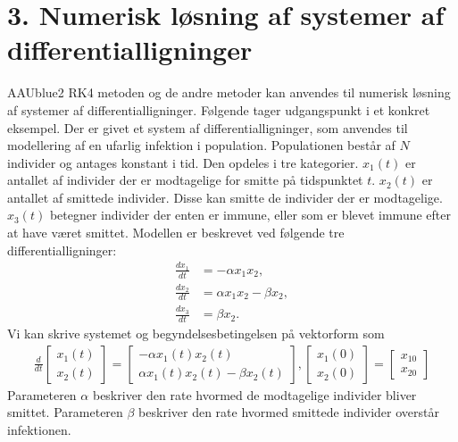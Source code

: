 \section*{3. Numerisk løsning af systemer af differentialligninger}
% 
%
\begin{color}{AAUblue2}
%
RK4 metoden og de andre metoder kan anvendes til numerisk løsning af systemer af differentialligninger. 
Følgende tager udgangspunkt i et konkret eksempel. Der er givet et system af differentialligninger, som anvendes til modellering af en ufarlig infektion i population. 
Populationen består af $N$ individer og antages konstant i tid. Den opdeles i tre kategorier. $x_1(t)$ er antallet af individer
der er modtagelige for smitte på tidspunktet $t$. $x_2(t)$ er antallet af smittede individer.
Disse kan smitte de individer der er modtagelige. 
$x_3(t)$ betegner individer der enten er immune, eller som er blevet immune efter at have været smittet.
%
Modellen er beskrevet ved følgende tre differentialligninger: 
%
\begin{align}
\frac{dx_1}{dt} & = - \alpha x_1 x_2, \\
\frac{dx_2}{dt} & = \alpha x_1 x_2 - \beta x_2 , \\
\frac{dx_3}{dt} & = \beta x_2.
\end{align}
%
Vi kan skrive systemet og begyndelsesbetingelsen på vektorform som
%
\begin{align*}
\frac{d}{dt} 
\begin{bmatrix}
x_1 (t) \\
x_2 (t) 
\end{bmatrix} = 
\begin{bmatrix}
- \alpha x_1 (t) x_2 (t) \\
\alpha x_1 (t) x_2 (t) - \beta x_2 (t) 
\end{bmatrix}
,
\begin{bmatrix}
x_1 (0) \\
x_2 (0) 
\end{bmatrix}
= 
\begin{bmatrix}
x_{10} \\
x_{20}
\end{bmatrix}
\end{align*}
%
Parameteren $\alpha$ beskriver den rate hvormed de modtagelige individer bliver smittet.
Parameteren $\beta$ beskriver den rate hvormed smittede individer overstår infektionen. 
% 
\end{color}
%



 
